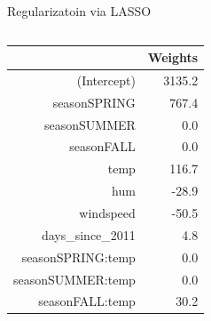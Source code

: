 \documentclass[11pt,compress,t,notes=noshow, aspectratio=169, xcolor=table]{beamer}
\begin{document}
\begin{frame}{Regularizatoin via LASSO }
\begin{columns}[T, totalwidth=\linewidth]
\begin{column}{0.35\textwidth}
\tiny
\begin{table}[ht]
\centering
\begin{tabular}{rr}
  \hline
 & Weights \\ 
  \hline
(Intercept) & 3135.2 \\ 
  seasonSPRING & 767.4 \\ 
  seasonSUMMER & 0.0 \\ 
  seasonFALL & 0.0 \\ 
  temp & 116.7 \\ 
  hum & -28.9 \\ 
  windspeed & -50.5 \\ 
  days\_since\_2011 & 4.8 \\ 
  seasonSPRING:temp & 0.0 \\ 
  seasonSUMMER:temp & 0.0 \\ 
  seasonFALL:temp & 30.2 \\ 
   \hline
\end{tabular}
\end{table}
\end{column}
\end{columns}

\end{frame}
\end{document}
